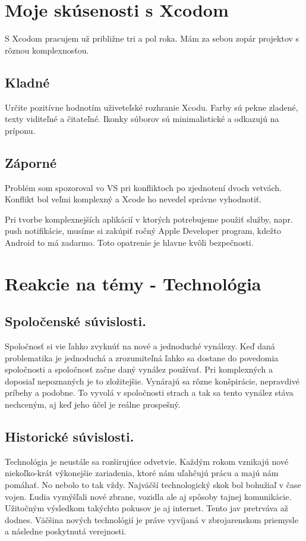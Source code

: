 \documentclass[12pt]{article}
\begin{document}
	\newpage
		\section{Moje skúsenosti s Xcodom}
			S Xcodom pracujem už približne tri a pol roka.  Mám za sebou zopár projektov s rôznou komplexnosťou. 

		\subsection{Kladné}
			Určite pozitívne hodnotím uživeteľské rozhranie Xcodu.  Farby sú pekne zladené,  texty viditeľné a čitateľné.  Ikonky súborov sú minimalistické a odkazujú na príponu.  \par

		\subsection{Záporné}
			Problém som spozoroval vo VS pri konfliktoch po zjednotení dvoch vetvách.  Konflikt bol veľmi komplexný a Xcode ho nevedel správne 	vyhodnotiť.  \par
			Pri tvorbe komplexnejších aplikácií v ktorých potrebujeme použiť služby,  napr.  push notifikácie,  musíme si zakúpiť ročný Apple Developer program,  kdežto Android to má zadarmo.  Toto opatrenie je hlavne kvôli bezpečnosti.

	\newpage
		\section{Reakcie na témy - Technológia}
		\subsection{Spoločenské súvislosti.}
			Spoločnosť si vie ľahko zvyknúť na nové a jednoduché vynálezy.  Keď daná problematika je jednoduchá a zrozumiteľná ľahko sa dostane do povedomia spoločnosti a spoločnosť začne daný vynález používať.  Pri komplexných a doposiaľ nepoznaných je to zložitejšie.  Vynárajú sa rôzne konšpirácie,  nepravdivé príbehy a podobne.  To vyvolá v spoločnosti strach a tak sa tento vynález stáva nechceným,  aj keď jeho účel je reálne prospešný.
		\subsection{Historické súvislosti.}
			Technológia je neustále sa rozširujúce odvetvie.  Každým rokom vznikajú nové niekoľko-krát výkonejšie zariadenia,  ktoré nám uľahčujú prácu a majú nám pomáhať.  No nebolo to tak vždy.  Najväčší technologický skok bol bohužiaľ v čase vojen.  Ľudia vymýšľali nové zbrane,  vozidla ale aj spôsoby tajnej komunikácie.  Užitočným výsledkom takýchto pokusov je aj internet.  Tento jav pretrváva až dodnes.  Väčšina nových technológií je práve vyvíjaná v zbrojarenskom priemysle a následne poskytnutá verejnosti.   
\end{document}
